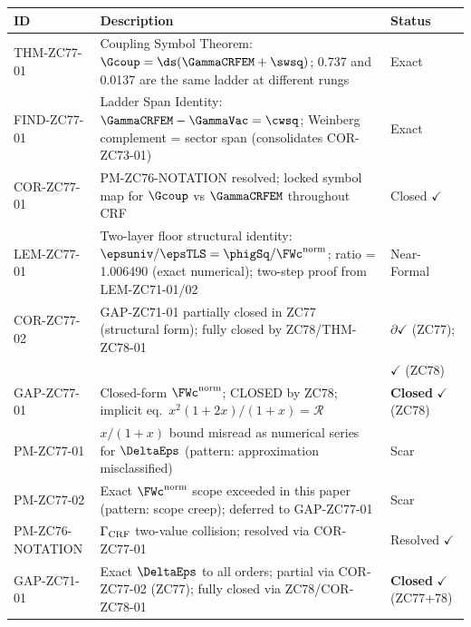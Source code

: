 \documentclass[12pt, a4paper]{article}
\begin{document}
\begin{formalbox}[title={Atomic Registry --- ZC77}]
\begin{center}
\renewcommand{\arraystretch}{1.3}
\small
\begin{tabular}{lp{7.2cm}p{3.0cm}}
\toprule
\textbf{ID} & \textbf{Description} & \textbf{Status} \\
\midrule
THM-ZC77-01
  & Coupling Symbol Theorem: $\Gcoup = \ds(\GammaCRFEM + \swsq)$;
    0.737 and 0.0137 are the same ladder at different rungs
  & Exact \\[3pt]
FIND-ZC77-01
  & Ladder Span Identity: $\GammaCRFEM - \GammaVac = \cwsq$;
    Weinberg complement = sector span (consolidates COR-ZC73-01)
  & Exact \\[3pt]
COR-ZC77-01
  & PM-ZC76-NOTATION resolved; locked symbol map for $\Gcoup$
    vs $\GammaCRFEM$ throughout CRF
  & Closed $\checkmark$ \\[3pt]
LEM-ZC77-01
  & Two-layer floor structural identity: $\epsuniv/\epsTLS =
    \phigSq/\FWc^{\rm norm}$; ratio = 1.006490 (exact numerical);
    two-step proof from LEM-ZC71-01/02
  & Near-Formal \\[3pt]
COR-ZC77-02
  & GAP-ZC71-01 partially closed in ZC77 (structural form);
    fully closed by ZC78/THM-ZC78-01
  & $\partial\checkmark$ (ZC77);\\[1pt]
  & & $\checkmark$ (ZC78) \\[3pt]
GAP-ZC77-01
  & Closed-form $\FWc^{\rm norm}$; CLOSED by ZC78;
    implicit eq.\ $x^2(1+2x)/(1+x) = \mathcal{R}$
  & \textbf{Closed} $\checkmark$ (ZC78) \\[3pt]
PM-ZC77-01
  & $x/(1+x)$ bound misread as numerical series for $\DeltaEps$
    (pattern: approximation misclassified)
  & Scar \\[3pt]
PM-ZC77-02
  & Exact $\FWc^{\rm norm}$ scope exceeded in this paper
    (pattern: scope creep); deferred to GAP-ZC77-01
  & Scar \\[3pt]
\midrule
PM-ZC76-NOTATION
  & $\Gamma_{\rm CRF}$ two-value collision; resolved via COR-ZC77-01
  & Resolved $\checkmark$ \\[3pt]
GAP-ZC71-01
  & Exact $\DeltaEps$ to all orders; partial via COR-ZC77-02 (ZC77);
    fully closed via ZC78/COR-ZC78-01
  & \textbf{Closed} $\checkmark$ (ZC77+78) \\
\bottomrule
\end{tabular}
\end{center}
\end{formalbox}
\end{document}
